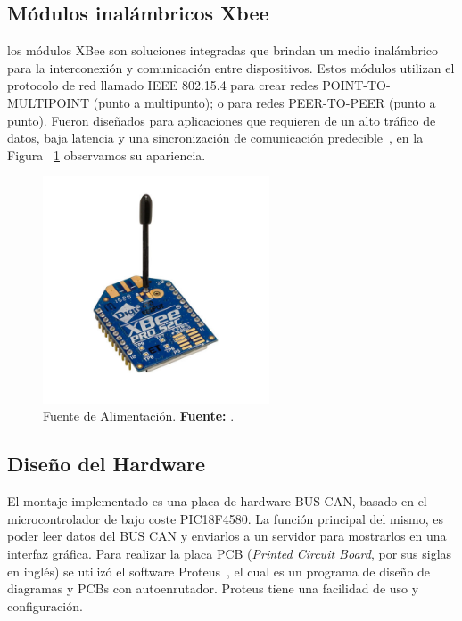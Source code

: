 \subsection{Módulos inalámbricos Xbee}
 los módulos XBee son soluciones integradas que brindan un medio inalámbrico para la interconexión y comunicación entre dispositivos. Estos módulos utilizan el protocolo de red llamado IEEE 802.15.4 para crear redes POINT-TO-MULTIPOINT (punto a multipunto); o para redes PEER-TO-PEER (punto a punto). Fueron diseñados para aplicaciones que requieren de un alto tráfico de datos, baja latencia y una sincronización de comunicación predecible~\cite{xbee_c4}, en la Figura ~\ref{fig_xbee_4} observamos su apariencia. 
 
\begin{figure}[H]
	\centering
		\includegraphics[width=0.6\textwidth]{./Cap4imagen/xbee_modulo.jpg}
	\caption[Fuente de Alimentación.]{Fuente de Alimentación.\textbf{ Fuente:}  \cite{cite_xbee_4}.}
	\label{fig_xbee_4} %
\end{figure}


\subsection{Diseño del Hardware}
El montaje implementado es una placa de hardware BUS CAN, basado en el microcontrolador de bajo coste PIC18F4580. La función principal del mismo, es poder leer datos del BUS
CAN y enviarlos a un servidor para mostrarlos en una interfaz gráfica. 
Para realizar la placa PCB (\textit{Printed Circuit Board}, por sus siglas en inglés) se utilizó el software Proteus~\cite{pro},  el cual es un programa de diseño de diagramas y PCBs con autoenrutador. 
Proteus tiene una facilidad de uso y configuración.


